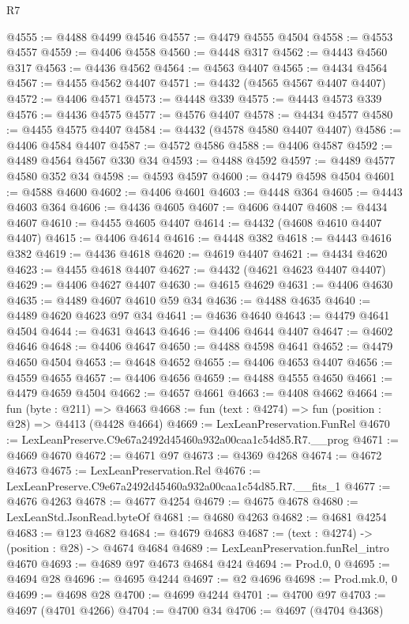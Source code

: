 \begin{lexlean}{R7}
\begin{coremodule}
@4555 := @4488 @4499 @4546
@4557 := @4479 @4555 @4504
@4558 := @4553 @4557
@4559 := @4406 @4558
@4560 := @4448 @317
@4562 := @4443 @4560 @317
@4563 := @4436 @4562
@4564 := @4563 @4407
@4565 := @4434 @4564
@4567 := @4455 @4562 @4407
@4571 := @4432 (@4565 @4567 @4407 @4407)
@4572 := @4406 @4571
@4573 := @4448 @339
@4575 := @4443 @4573 @339
@4576 := @4436 @4575
@4577 := @4576 @4407
@4578 := @4434 @4577
@4580 := @4455 @4575 @4407
@4584 := @4432 (@4578 @4580 @4407 @4407)
@4586 := @4406 @4584 @4407
@4587 := @4572 @4586
@4588 := @4406 @4587
@4592 := @4489 @4564 @4567 @330 @34
@4593 := @4488 @4592
@4597 := @4489 @4577 @4580 @352 @34
@4598 := @4593 @4597
@4600 := @4479 @4598 @4504
@4601 := @4588 @4600
@4602 := @4406 @4601
@4603 := @4448 @364
@4605 := @4443 @4603 @364
@4606 := @4436 @4605
@4607 := @4606 @4407
@4608 := @4434 @4607
@4610 := @4455 @4605 @4407
@4614 := @4432 (@4608 @4610 @4407 @4407)
@4615 := @4406 @4614
@4616 := @4448 @382
@4618 := @4443 @4616 @382
@4619 := @4436 @4618
@4620 := @4619 @4407
@4621 := @4434 @4620
@4623 := @4455 @4618 @4407
@4627 := @4432 (@4621 @4623 @4407 @4407)
@4629 := @4406 @4627 @4407
@4630 := @4615 @4629
@4631 := @4406 @4630
@4635 := @4489 @4607 @4610 @59 @34
@4636 := @4488 @4635
@4640 := @4489 @4620 @4623 @97 @34
@4641 := @4636 @4640
@4643 := @4479 @4641 @4504
@4644 := @4631 @4643
@4646 := @4406 @4644 @4407
@4647 := @4602 @4646
@4648 := @4406 @4647
@4650 := @4488 @4598 @4641
@4652 := @4479 @4650 @4504
@4653 := @4648 @4652
@4655 := @4406 @4653 @4407
@4656 := @4559 @4655
@4657 := @4406 @4656
@4659 := @4488 @4555 @4650
@4661 := @4479 @4659 @4504
@4662 := @4657 @4661
@4663 := @4408 @4662
@4664 := fun (byte : @211) => @4663
@4668 := fun (text : @4274) => fun (position : @28) => @4413 (@4428 @4664)
@4669 := LexLeanPreservation.FunRel
@4670 := LexLeanPreserve.C9e67a2492d45460a932a00caa1c54d85.R7.__prog
@4671 := @4669 @4670
@4672 := @4671 @97
@4673 := @4369 @4268
@4674 := @4672 @4673
@4675 := LexLeanPreservation.Rel
@4676 := LexLeanPreserve.C9e67a2492d45460a932a00caa1c54d85.R7.__fits_1
@4677 := @4676 @4263
@4678 := @4677 @4254
@4679 := @4675 @4678
@4680 := LexLeanStd.JsonRead.byteOf
@4681 := @4680 @4263
@4682 := @4681 @4254
@4683 := @123 @4682
@4684 := @4679 @4683
@4687 := (text : @4274) -> (position : @28) -> @4674 @4684
@4689 := LexLeanPreservation.funRel_intro @4670
@4693 := @4689 @97 @4673 @4684 @424
@4694 := Prod.{0, 0}
@4695 := @4694 @28
@4696 := @4695 @4244
@4697 := @2 @4696
@4698 := Prod.mk.{0, 0}
@4699 := @4698 @28
@4700 := @4699 @4244
@4701 := @4700 @97
@4703 := @4697 (@4701 @4266)
@4704 := @4700 @34
@4706 := @4697 (@4704 @4368)

\end{coremodule}
\end{lexlean}

